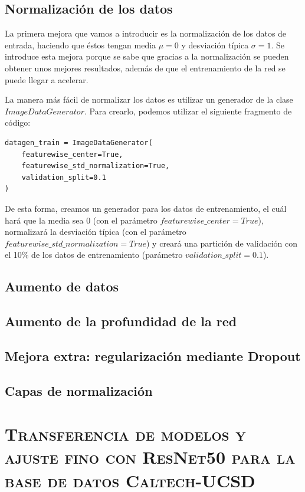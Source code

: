 \documentclass[11pt,a4paper]{article}
\begin{document}
\subsection{Normalización de los datos}

La primera mejora que vamos a introducir es la normalización de los datos de entrada, haciendo que éstos tengan media
$\mu = 0$ y desviación típica $\sigma = 1$. Se introduce esta mejora porque se sabe que gracias a la normalización se pueden
obtener unos mejores resultados, además de que el entrenamiento de la red se puede llegar a acelerar.

La manera más fácil de normalizar los datos es utilizar un generador de la clase $ImageDataGenerator$. Para crearlo, podemos
utilizar el siguiente fragmento de código:

\begin{lstlisting}
datagen_train = ImageDataGenerator(
    featurewise_center=True,
    featurewise_std_normalization=True,
    validation_split=0.1
)
\end{lstlisting}

De esta forma, creamos un generador para los datos de entrenamiento, el cuál hará que la media sea 0 (con el parámetro
$featurewise\_center = True$), normalizará la desviación típica (con el parámetro $featurewise\_std\_normalization = True$)
y creará una partición de validación con el 10\% de los datos de entrenamiento (parámetro $validation\_split = 0.1$).

\subsection{Aumento de datos}

\subsection{Aumento de la profundidad de la red}

\subsection{Mejora extra: regularización mediante Dropout}

\subsection{Capas de normalización}

\section{\textsc{Transferencia de modelos y ajuste fino con ResNet50 para la base de datos Caltech-UCSD}}

\newpage



\end{document}
